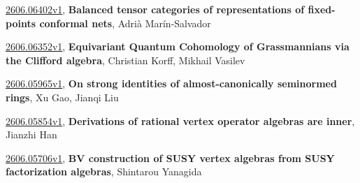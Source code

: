 \documentclass[9pt, a4paper]{article}
\theoremstyle{plain}
\theoremstyle{definition}
\theoremstyle{remark}
\newcommand{\arxiv}[3]{\href{https://arxiv.org/abs/#1}{#1}, \textbf{\textcolor{arxivblue}{#2}}, #3}
\begin{document}
\arxiv{2606.06402v1}{Balanced tensor categories of representations of fixed-points conformal nets}{Adrià Marín-Salvador}

\arxiv{2606.06352v1}{Equivariant Quantum Cohomology of Grassmannians via the Clifford algebra}{Christian Korff, Mikhail Vasilev}

\arxiv{2606.05965v1}{On strong identities of almost-canonically seminormed rings}{Xu Gao, Jianqi Liu}

\arxiv{2606.05854v1}{Derivations of rational vertex operator algebras are inner}{Jianzhi Han}

\arxiv{2606.05706v1}{BV construction of SUSY vertex algebras from SUSY factorization algebras}{Shintarou Yanagida}

\end{document}
